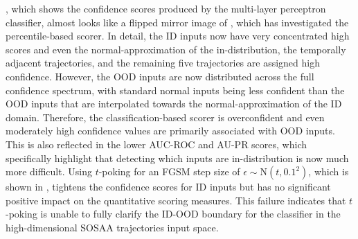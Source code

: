 \noindent {}, which shows the confidence scores produced by the multi-layer perceptron classifier, almost looks like a flipped mirror image of , which has investigated the percentile-based scorer. In detail, the ID inputs now have very concentrated high scores and even the normal-approximation of the in-distribution, the temporally adjacent trajectories, and the remaining five trajectories are assigned high confidence. However, the OOD inputs are now distributed across the full confidence spectrum, with standard normal inputs being less confident than the OOD inputs that are interpolated towards the normal-approximation of the ID domain. Therefore, the classification-based scorer is overconfident and even moderately high confidence values are primarily associated with OOD inputs. This is also reflected in the lower AUC-ROC and AU-PR scores, which specifically highlight that detecting which inputs are in-distribution is now much more difficult. Using $t$-poking for an FGSM step size of $\epsilon \sim \text{N}(t, 0.1^2)$, which is shown in , tightens the confidence scores for ID inputs but has no significant positive impact on the quantitative scoring measures. This failure indicates that $t$-poking is unable to fully clarify the ID-OOD boundary for the classifier in the high-dimensional SOSAA trajectories input space.

